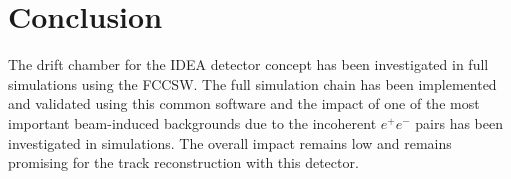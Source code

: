 \documentclass[conference]{IEEEtran}
\begin{document}
\section{Conclusion}
The drift chamber for the IDEA detector concept has been investigated in full simulations using the FCCSW. The full simulation chain has been implemented and validated using this common software and the impact of one of the most important beam-induced backgrounds due to the incoherent $e^+e^-$ pairs has been investigated in simulations. The overall impact remains low and remains promising for the track reconstruction with this detector.


%





%
%
\end{document}
